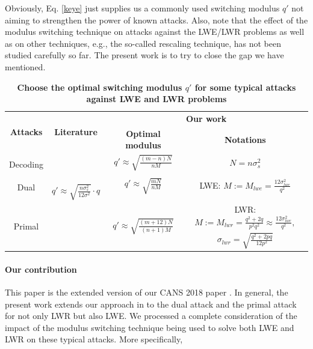\documentclass{cta-author}
\begin{document}
Obviously, Eq. \eqref{keye} just supplies us a commonly used switching modulus $q'$ not aiming to strengthen the power of known attacks.  Also, note that the effect of the modulus switching technique on attacks against the LWE/LWR problems as well as on other techniques, e.g., the so-called rescaling technique, has not been studied carefully so far. The present work is to try to close the gap we have mentioned. 



\begin{table}[t]
	\caption{\textbf{Choose the optimal switching modulus  $q'$ for some typical attacks against LWE and LWR problems} } 
	\centering
	\small\addtolength{\tabcolsep}{0pt}
	\begin{tabular}{ c || c | c|  c  }
		\hline
		\multirow{2}{*}{\textbf{Attacks}}&\multirow{2}{*}{\textbf{Literature} \cite{APS15}} & \multicolumn{2}{c}{\textbf{Our work}}   \\
	
		&& \textbf{Optimal modulus} & \textbf{Notations}  \\
		\hline
		\hline
		\multirow{2}{*}{Decoding }&\multirow{6}{*}{
			$q' \approx \sqrt{\frac{n\sigma_s^2}{12\sigma^2}}\cdot q $
		}&$q'\approx \sqrt{\frac{(m-n)N}{nM}}$ &$N=n\sigma_s^2$\\
		& & & \\
	
		
		\multirow{2}{*}{Dual}& &$q' \approx \sqrt{\frac{mN}{nM}}$&LWE: $M:=M_{lwe}=\frac{12\sigma_{lwe}^2}{q^2}$ \\ %
			& & & \\
		& $\approx \sqrt{N/M}$& &\\

		\multirow{2}{*}{Primal}  & &\multirow{2}{*}{$q' \approx \sqrt{\frac{(m+12)N}{(n+1)M}}$}&LWR: $M:=M_{lwr}=\frac{q^2+2q}{p^2q^2} \approx \frac{12\sigma_{lwr}^2}{q^2},$\\
		&&& $\sigma_{lwr}=\sqrt{\frac{q^2+2pq}{12p^2}}$\\
		\hline 
	\end{tabular} \label{tab2}
\end{table}


\paragraph{Our contribution}
 This paper is the extended version of our CANS 2018 paper \cite{LMDY18}.
In general, the present work extends our approach in \cite{LMDY18} to the dual attack and the primal attack for not only LWR but also LWE. 
We processed a complete consideration of the impact of the modulus switching technique being used to solve both LWE and LWR on these typical attacks. More specifically,
\end{document}
